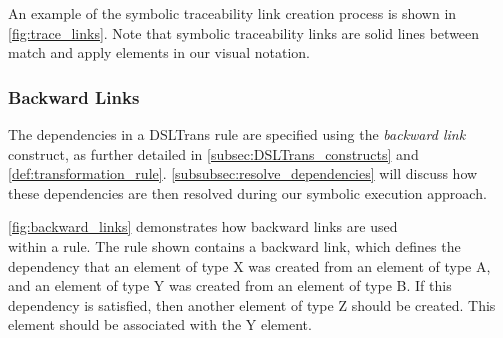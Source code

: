 An example of the symbolic traceability link creation process is shown in
\cref{fig:trace_links}. Note that symbolic traceability links are solid lines between
match and apply elements in our visual notation.



\subsubsection{Backward Links}
\label{subsubsec:backward_links}

The dependencies in a DSLTrans rule are specified using the \textit{backward link} construct, as further detailed in \cref{subsec:DSLTrans_constructs} and \cref{def:transformation_rule}. \cref{subsubsec:resolve_dependencies} will discuss how these dependencies are then resolved during our symbolic execution approach.

\cref{fig:backward_links} demonstrates how backward links are used \\within a rule. The rule shown contains a backward link, which defines the dependency that an element of type X was created from an element of type A, and an element of type Y was created from an element of type B. If this dependency is satisfied, then another element of type Z should be created. This element should be associated with the Y element.

